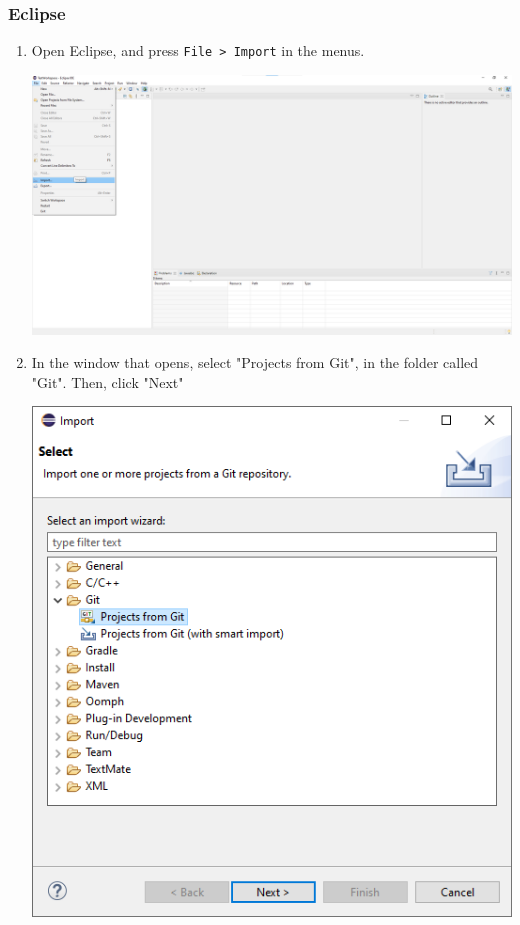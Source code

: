 \documentclass[11pt]{article}
\begin{document}
\subsubsection{Eclipse}
\label{sec:org9a285be}
\begin{enumerate}
\item Open Eclipse, and press \texttt{File > Import} in the menus.
\begin{center}
\includegraphics[width=.9\linewidth]{./screenshot-eclipse-install-1.png}
\end{center}
\item In the window that opens, select "Projects from Git", in the folder called "Git".  Then, click "Next"
\begin{center}
\includegraphics[width=.9\linewidth]{./screenshot-eclipse-install-2.png}

\end{center}
\end{enumerate}
\end{document}

